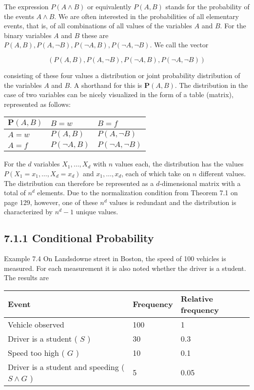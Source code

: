 \documentclass[10pt]{article}
\begin{document}
The expression $P(A \wedge B)$ or equivalently $P(A, B)$ stands for the probability of the events $A \wedge B$. We are often interested in the probabilities of all elementary events, that is, of all combinations of all values of the variables $A$ and $B$. For the binary variables $A$ and $B$ these are $P(A, B), P(A, \neg B), P(\neg A, B), P(\neg A, \neg B)$. We call the vector

$$
(P(A, B), P(A, \neg B), P(\neg A, B), P(\neg A, \neg B))
$$

consisting of these four values a distribution or joint probability distribution of the variables $A$ and $B$. A shorthand for this is $\boldsymbol{P}(A, B)$. The distribution in the case of two variables can be nicely visualized in the form of a table (matrix), represented as follows:

\begin{center}
\begin{tabular}{lll}
\hline
$\boldsymbol{P}(A, B)$ & $B=w$ & $B=f$ \\
\hline
$A=w$ & $P(A, B)$ & $P(A, \neg B)$ \\
\hline
$A=f$ & $P(\neg A, B)$ & $P(\neg A, \neg B)$ \\
\hline
\end{tabular}
\end{center}

For the $d$ variables $X_{1}, \ldots, X_{d}$ with $n$ values each, the distribution has the values $P\left(X_{1}=x_{1}, \ldots, X_{d}=x_{d}\right)$ and $x_{1}, \ldots, x_{d}$, each of which take on $n$ different values. The distribution can therefore be represented as a $d$-dimensional matrix with a total of $n^{d}$ elements. Due to the normalization condition from Theorem 7.1 on page 129, however, one of these $n^{d}$ values is redundant and the distribution is characterized by $n^{d}-1$ unique values.

\subsection*{7.1.1 Conditional Probability}
Example 7.4 On Landsdowne street in Boston, the speed of 100 vehicles is measured. For each measurement it is also noted whether the driver is a student. The results are

\begin{center}
\begin{tabular}{|l|l|l|}
\hline
Event & Frequency & Relative frequency \\
\hline
Vehicle observed & 100 & 1 \\
\hline
Driver is a student ( $S$ ) & 30 & 0.3 \\
\hline
Speed too high ( $G$ ) & 10 & 0.1 \\
\hline
Driver is a student and speeding ( $S \wedge G$ ) & 5 & 0.05 \\
\hline
\end{tabular}
\end{center}
\end{document}
